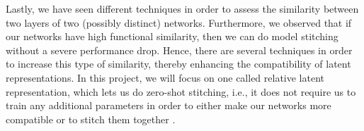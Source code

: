 \documentclass[../main.tex]{subfiles}
\begin{document}
Lastly, we have seen different techniques in order to assess the similarity between two layers of two (possibly distinct) networks. Furthermore, we observed that if our networks have high functional similarity, then we can do model stitching without a severe performance drop. Hence, there are several techniques in order to increase this type of similarity, thereby enhancing the compatibility of latent representations. In this project, we will focus on one called relative latent representation, which lets us do zero-shot stitching, i.e., it does not require us to train any additional parameters in order to either make our networks more compatible or to stitch them together \cite{moschella_relative_2022}.  
\end{document}
